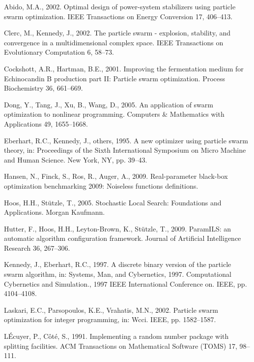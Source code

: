 \documentclass[12pt]{article}
\begin{document}
\begin{thebibliography}{20}

Abido, M.A., 2002. Optimal design of power-system stabilizers using particle swarm optimization. IEEE Transactions on Energy Conversion 17, 406–413. %

Clerc, M., Kennedy, J., 2002. The particle swarm - explosion, stability, and convergence in a multidimensional complex space. IEEE Transactions on Evolutionary Computation 6, 58–73. %

Cockshott, A.R., Hartman, B.E., 2001. Improving the fermentation medium for Echinocandin B production part II: Particle swarm optimization. Process Biochemistry 36, 661–669. %

Dong, Y., Tang, J., Xu, B., Wang, D., 2005. An application of swarm optimization to nonlinear programming. Computers \& Mathematics with Applications 49, 1655–1668. %

Eberhart, R.C., Kennedy, J., others, 1995. A new optimizer using particle swarm theory, in: Proceedings of the Sixth International Symposium on Micro Machine and Human Science. New York, NY, pp. 39–43.

Hansen, N., Finck, S., Ros, R., Auger, A., 2009. Real-parameter black-box optimization benchmarking 2009: Noiseless functions definitions.

Hoos, H.H., Stützle, T., 2005. Stochastic Local Search: Foundations and Applications. Morgan Kaufmann.

Hutter, F., Hoos, H.H., Leyton-Brown, K., Stützle, T., 2009. ParamILS: an automatic algorithm configuration framework. Journal of Artificial Intelligence Research 36, 267–306.

Kennedy, J., Eberhart, R.C., 1997. A discrete binary version of the particle swarm algorithm, in: Systems, Man, and Cybernetics, 1997. Computational Cybernetics and Simulation., 1997 IEEE International Conference on. IEEE, pp. 4104–4108.

Laskari, E.C., Parsopoulos, K.E., Vrahatis, M.N., 2002. Particle swarm optimization for integer programming, in: Wcci. IEEE, pp. 1582–1587.

L\'Ecuyer, P., C\^{o}t\'{e}, S., 1991. Implementing a random number package with splitting facilities. ACM Transactions on Mathematical Software (TOMS) 17, 98–111.


\end{thebibliography}
\end{document}
